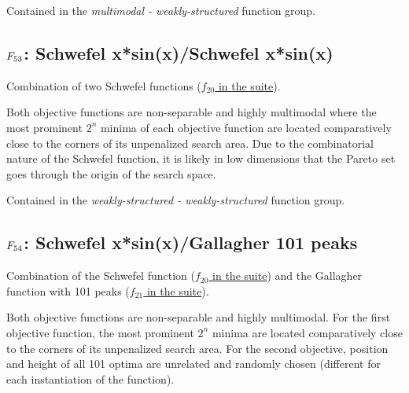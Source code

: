 Contained in the \emph{multimodal - weakly-structured} function group.



\subsection[\texorpdfstring{\protect\(F_{53}\protect\): Schwefel x*sin(x)/Schwefel x*sin(x)}{F53: Schwefel x*sin(x)/Schwefel x*sin(x)}]{\texorpdfstring{\protect\(F_{53}\protect\): Schwefel x*sin(x)/Schwefel x*sin(x)}{}}
\label{index:schwefel-x-sin-x-schwefel-x-sin-x}\label{index:f53}
Combination of two Schwefel functions (\href{https://coco.gforge.inria.fr/downloads/download16.00/bbobdocfunctions.pdf\#page=100}{\(f_{20}\) in the \bbob suite}).

Both objective functions are non-separable and highly multimodal where
the most prominent \(2^n\) minima of each objective function are
located comparatively close to the corners of its unpenalized search area.
Due to the combinatorial nature of the Schwefel function, it is likely
in low dimensions that the Pareto set goes through the origin of the
search space.

Contained in the \emph{weakly-structured - weakly-structured} function group.



\subsection[\texorpdfstring{\protect\(F_{54}\protect\): Schwefel x*sin(x)/Gallagher 101 peaks}{F54: Schwefel x*sin(x)/Gallagher 101 peaks}]{\texorpdfstring{\protect\(F_{54}\protect\): Schwefel x*sin(x)/Gallagher 101 peaks}{}}
\label{index:f54}\label{index:schwefel-x-sin-x-gallagher-101-peaks}
Combination of the Schwefel function (\href{https://coco.gforge.inria.fr/downloads/download16.00/bbobdocfunctions.pdf\#page=100}{\(f_{20}\) in the \bbob suite}) and the Gallagher function with
101 peaks (\href{https://coco.gforge.inria.fr/downloads/download16.00/bbobdocfunctions.pdf\#page=105}{\(f_{21}\) in the \bbob suite}).

Both objective functions are non-separable and highly multimodal.
For the first objective function, the most prominent \(2^n\) minima
are located comparatively close to the corners of its unpenalized search
area. For the second objective, position and height of all
101 optima are unrelated and randomly
chosen (different for each instantiation of the function).

